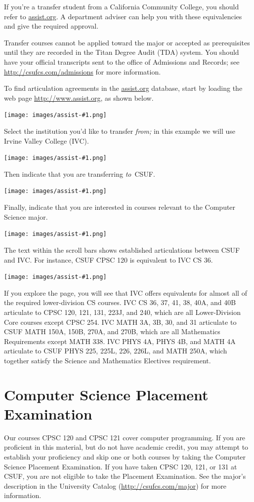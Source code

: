 \documentclass{book}
\newcommand{\CampusName}{CSUF}
\newcommand{\shrunkurl}[1]{\url{http://csufcs.com/#1}}
\begin{document}
If you're a transfer student from a California Community College, you should refer to \url{assist.org}. A department adviser can help you with these equivalencies and give the required approval.

Transfer courses cannot be applied toward the major or accepted as prerequisites until they are recorded in the Titan Degree Audit (TDA) system. You should have your official transcripts sent to the office of Admissions and Records; see \shrunkurl{admissions} for more information.

To find articulation agreements in the \url{assist.org} database, start by loading the web page \url{http://www.assist.org}, as shown below.

\newcommand{\AssistOrgScreenshot}[1]{
  \begin{center}
    \texttt{[image: images/assist-\#1.png]}
  \end{center}
}

\AssistOrgScreenshot{1}

Select the institution you'd like to transfer \emph{from;} in this example we will use Irvine Valley College (IVC).

\AssistOrgScreenshot{2}

Then indicate that you are transferring \emph{to}~\CampusName.

\AssistOrgScreenshot{3}

Finally, indicate that you are interested in courses relevant to the Computer Science major.

\AssistOrgScreenshot{4}

The text within the scroll bars shows established articulations between CSUF and IVC. For instance, CSUF CPSC 120 is equivalent to IVC CS 36.

\AssistOrgScreenshot{5}

If you explore the page, you will see that IVC offers equivalents for almost all of the required lower-division CS courses. IVC CS 36, 37, 41, 38, 40A, and 40B articulate to CPSC 120, 121, 131, 223J, and 240, which are all Lower-Division Core courses except CPSC 254. IVC MATH 3A, 3B, 30, and 31 articulate to CSUF MATH 150A, 150B, 270A, and 270B, which are all Mathematics Requirements except MATH 338. IVC PHYS 4A, PHYS 4B, and MATH 4A articulate to CSUF PHYS 225, 225L, 226, 226L, and MATH 250A, which together satisfy the Science and Mathematics Electives requirement.

\section{Computer Science Placement Examination}
\label{section:placement}
 Our courses CPSC 120 and CPSC 121 cover
computer programming. If you are proficient in this material, but do
not have academic credit, you may attempt to establish your
proficiency and skip one or both courses by taking the Computer
Science Placement Examination. If you have taken CPSC 120, 121, or 131
at \CampusName, you are not eligible to take the Placement
Examination. See the major's description in the University Catalog
(\shrunkurl{major}) for more information.
\end{document}
